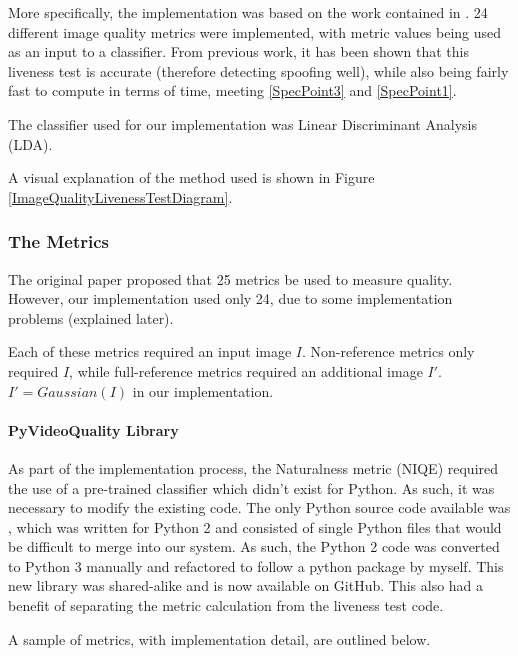 \documentclass[12pt,a4paper]{article}
\begin{document}
            More specifically, the implementation was based on the work contained in \cite{ImageQualityAssessmentTest}. 24 different image quality metrics were implemented,
            with metric values being used as an input to a classifier. From previous work, it has been shown that this liveness test is accurate (therefore detecting spoofing well), while also being fairly fast to compute in terms of time, meeting \ref{SpecPoint3} and \ref{SpecPoint1}.

            The classifier used for our implementation was Linear Discriminant Analysis (LDA).

            A visual explanation of the method used is shown in Figure \ref{ImageQualityLivenessTestDiagram}.
    
            \subsubsection{The Metrics}
            The original paper proposed that 25 metrics be used to measure quality. However, our implementation used only 24, due to some implementation problems (explained later).

            Each of these metrics required an input image $I$. Non-reference metrics only required $I$, while full-reference metrics required an additional image $I'$. $I' = Gaussian(I)$ in our implementation.
            
            \paragraph{PyVideoQuality Library}
            As part of the implementation process, the Naturalness metric (NIQE) required the use of a pre-trained classifier which didn't exist for Python. As such, it was necessary to modify the existing code.
            The only Python source code available was \cite{VideoQualityOriginal}, which was written for Python 2 and consisted of single Python files that would be difficult to merge into our system.
            As such, the Python 2 code was converted to Python 3 manually and refactored to follow a python package by myself. This new library was shared-alike and is now available on GitHub. \cite{VideoQualityUpdated} This also had a benefit of separating the metric calculation from the liveness test code.
            
            A sample of metrics, with implementation detail, are outlined below.
           
\end{document}

